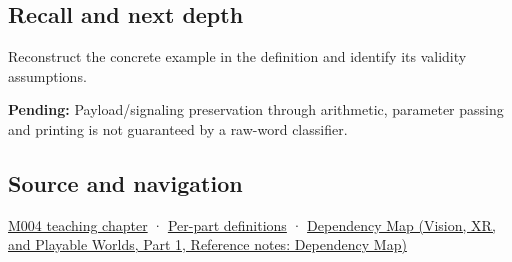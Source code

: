 \subsection{Recall and next depth}\label{appendix-d6607cc4c235-recall-and-next-depth}

\hypertarget{appendix-d6607cc4c235-recall-and-next-depth}{}

Reconstruct the concrete example in the definition and identify its validity assumptions.

\textbf{Pending:} Payload/signaling preservation through arithmetic, parameter passing and printing is not guaranteed by a raw-word classifier.

\subsection{Source and navigation}\label{appendix-d6607cc4c235-source-and-navigation}

\hypertarget{appendix-d6607cc4c235-source-and-navigation}{}

\hyperref[01-foundations-i-ch001-a-stretching-ruler-for-real-valued-quantities]{M004 teaching chapter} · \hyperref[appendix-fd090d982a15-m004---parts-61-76]{Per-part definitions} · \href{../07-Vision-XR-and-Playable-Worlds-P01/main.pdf\#appendix-4ad47bdd269a}{Dependency Map (Vision, XR, and Playable Worlds, Part 1, Reference notes: Dependency Map)}
